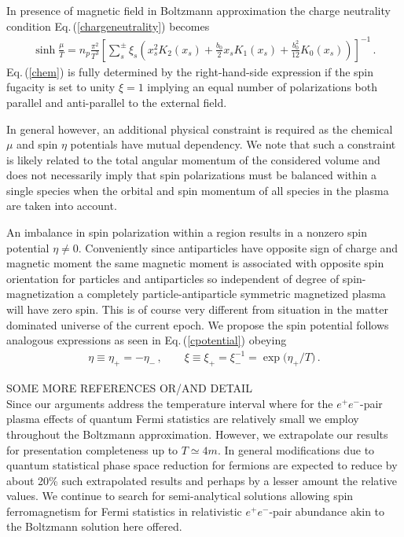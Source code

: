 \documentclass[a4paper]{article}
\newcommand{\req}[1]{Eq.\,(\ref{#1})}
\begin{document}
In presence of magnetic field in Boltzmann approximation the charge neutrality condition \req{chargeneutrality} becomes
\begin{align}
    \label{chem}
    \sinh{\frac{\mu}{T}}=n_{p}\frac{\pi^{2}}{T^{3}}\left[\sum_{s}^{\pm}\xi_{s}\left(x_{s}^{2}K_{2}(x_{s})+\frac{b_{0}}{2}x_{s}K_{1}(x_{s})+\frac{b_{0}^{2}}{12}K_{0}(x_{s})\right)\right]^{-1}\,.
\end{align}
\req{chem} is fully determined by the right-hand-side expression if the spin fugacity is set to unity $\xi=1$ implying an equal number of polarizations both parallel and anti-parallel to the external field. 

In general however, an additional physical constraint is required as the chemical $\mu$ and spin $\eta$ potentials have mutual dependency. We note that such a constraint is likely related to the total angular momentum of the considered volume and does not necessarily imply that spin polarizations must be balanced within a single species when the orbital and spin momentum of all species in the plasma are taken into account.

An imbalance in spin polarization within a region results in a nonzero spin potential $\eta\neq0$. Conveniently since antiparticles have opposite sign of charge and magnetic moment the same magnetic moment is associated with opposite spin orientation for particles and antiparticles so independent of degree of spin-magnetization  a completely particle-antiparticle symmetric magnetized plasma will have zero spin. This is of course very different from situation in the matter dominated universe of the current epoch.  We propose the spin potential follows analogous expressions as seen in \req{cpotential} obeying
\begin{align}
    \label{spotential}
    \eta\equiv\eta_{+}=-\eta_{-}\,,\qquad
    \xi\equiv\xi_{+}=\xi_{-}^{-1}= \exp{(\eta_+/T})\,.
\end{align}

SOME MORE REFERENCES OR/AND DETAIL\\

Since our arguments address the temperature interval  where for the  $e^{+}e^{-}$-pair plasma effects of quantum Fermi statistics are relatively small we employ throughout the Boltzmann approximation. However, we extrapolate our results for presentation completeness up to $T\simeq 4m$. In general modifications due to quantum statistical phase space reduction for fermions are expected to reduce by about 20\% such extrapolated results and perhaps by  a lesser amount the relative values. We continue to search for semi-analytical solutions allowing spin ferromagnetism for Fermi statistics in relativistic  $e^{+}e^{-}$-pair abundance akin to the Boltzmann solution here offered. 
\end{document}
